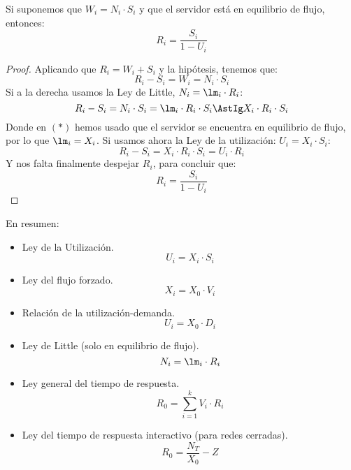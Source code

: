 \begin{prop}
    Si suponemos que $W_i = N_i\cdot S_i$ y que el servidor está en equilibrio de flujo, entonces:
    \begin{equation*}
        R_i = \dfrac{S_i}{1-U_i}
    \end{equation*}
    \begin{proof}
        Aplicando que $R_i = W_i + S_i$ y la hipótesis, tenemos que:
        \begin{equation*}
            R_i - S_i = W_i = N_i\cdot S_i 
        \end{equation*}
        Si a la derecha usamos la Ley de Little, $N_i = \lm_i \cdot R_i$:
        \begin{equation*}
            R_i - S_i = N_i \cdot S_i = \lm_i \cdot R_i \cdot S_i \AstIg X_i\cdot R_i \cdot S_i
        \end{equation*}
        Donde en $(\ast)$ hemos usado que el servidor se encuentra en equilibrio de flujo, por lo que $\lm_i = X_i$. Si usamos ahora la Ley de la utilización: $U_i = X_i\cdot S_i$:
        \begin{equation*}
            R_i - S_i = X_i\cdot R_i\cdot S_i = U_i \cdot R_i
        \end{equation*}
        Y nos falta finalmente despejar $R_i$, para concluir que:
        \begin{equation*}
            R_i = \dfrac{S_i}{1-U_i}
        \end{equation*}
    \end{proof}
\end{prop}

En resumen:
\begin{itemize}
    \item Ley de la Utilización.
        \begin{equation*}
            U_i = X_i \cdot S_i
        \end{equation*}
    \item Ley del flujo forzado.
        \begin{equation*}
            X_i = X_0\cdot V_i
        \end{equation*}
    \item Relación de la utilización-demanda.
        \begin{equation*}
            U_i = X_0\cdot D_i
        \end{equation*}
    \item Ley de Little (solo en equilibrio de flujo).
        \begin{equation*}
            N_i = \lm_i \cdot R_i
        \end{equation*}
    \item Ley general del tiempo de respuesta.
        \begin{equation*}
            R_0 = \sum_{i=1}^{k} V_i\cdot R_i
        \end{equation*}
    \item Ley del tiempo de respuesta interactivo (para redes cerradas).
        \begin{equation*}
            R_0 = \dfrac{N_T}{X_0}-Z
        \end{equation*}
\end{itemize}

